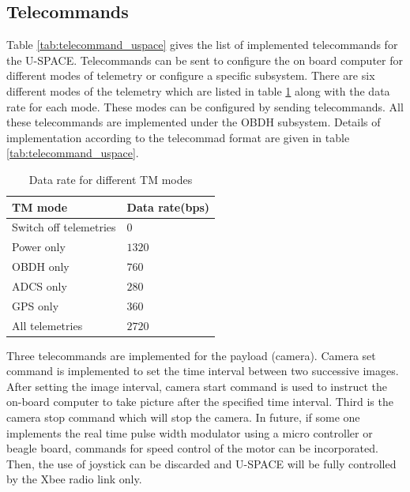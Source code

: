 \subsection{Telecommands}
\label{subsec:telecommand}
Table \ref{tab:telecommand_uspace} gives the list of implemented telecommands for the \ac{U-SPACE}. Telecommands can be sent to configure the on board computer for different modes of telemetry or configure a specific subsystem. There are six different modes of the telemetry which are listed in table \ref{tab:TM_modes} along with the data rate for each mode. These modes can be configured by sending telecommands. All these telecommands are implemented under the \ac{OBDH} subsystem. Details of implementation according to the telecommad format are given in table \ref{tab:telecommand_uspace}.
%
\begin{table}[bht]
\centering
\caption[Data rate for different \ac{TM} modes]{Data rate for different \ac{TM} modes}
\label{tab:TM_modes}
\begin{tabular}{|m{}m{}|}
\hline
\textbf{TM mode}			&  		\textbf{Data rate(bps)}   \\
\hline
Switch off telemetries		&		$ 0 $		 			  \\
Power only	   		        &		$ 1320 $		 		  \\
\ac{OBDH} only	      	  	&		$ 760 $		 			  \\
ADCS only			      	&		$ 280 $		 			  \\
GPS only		   		    & 		$ 360 $		 			  \\
All telemetries	      	  	&		$ 2720 $		 		  \\
\hline
\end{tabular}
\end{table}
Three telecommands are implemented for the payload (camera). Camera set command is implemented to set the time interval between two successive images. After setting the image interval, camera start command is used to instruct the on-board computer to take picture after the specified time interval. Third is the camera stop command which will stop the camera. In future, if some one implements the real time pulse width modulator using a micro controller or beagle board, commands for speed control of the motor can be incorporated. Then, the use of joystick can be discarded and U-SPACE will be fully controlled by the Xbee radio link only.

